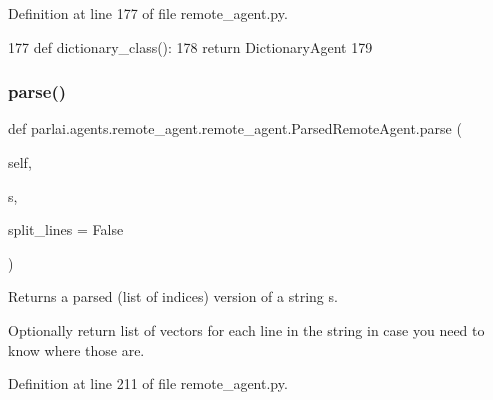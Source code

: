 Definition at line 177 of file remote\+\_\+agent.\+py.


\begin{DoxyCode}
177     \textcolor{keyword}{def }dictionary\_class():
178         \textcolor{keywordflow}{return} DictionaryAgent
179 
\end{DoxyCode}
\mbox{\label{classparlai_1_1agents_1_1remote__agent_1_1remote__agent_1_1ParsedRemoteAgent_af4dd0281fd7d6ceb4936f27eaab13f06}} 
\subsubsection{\texorpdfstring{parse()}{parse()}}
{\footnotesize\ttfamily def parlai.\+agents.\+remote\+\_\+agent.\+remote\+\_\+agent.\+Parsed\+Remote\+Agent.\+parse (\begin{DoxyParamCaption}\item[{}]{self,  }\item[{}]{s,  }\item[{}]{split\+\_\+lines = {\ttfamily False} }\end{DoxyParamCaption})}

\begin{DoxyVerb}Returns a parsed (list of indices) version of a string s.

Optionally return list of vectors for each line in the string in case you need
to know where those are.
\end{DoxyVerb}
 

Definition at line 211 of file remote\+\_\+agent.\+py.



